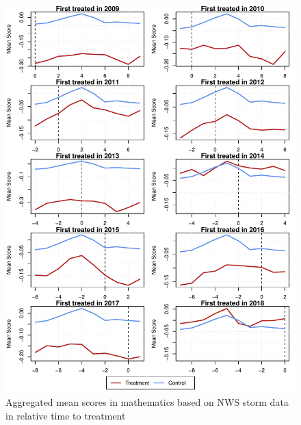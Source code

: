 \begin{figure}[!h]
	\centering
	\includegraphics[scale=1]{"../Code & Data/ParTrendsPlotMathematicsStorm.pdf"}
	\caption{Aggregated mean scores in mathematics based on NWS storm data in relative time to treatment}
	\label{PreTrendsMathStorm}
\end{figure}

